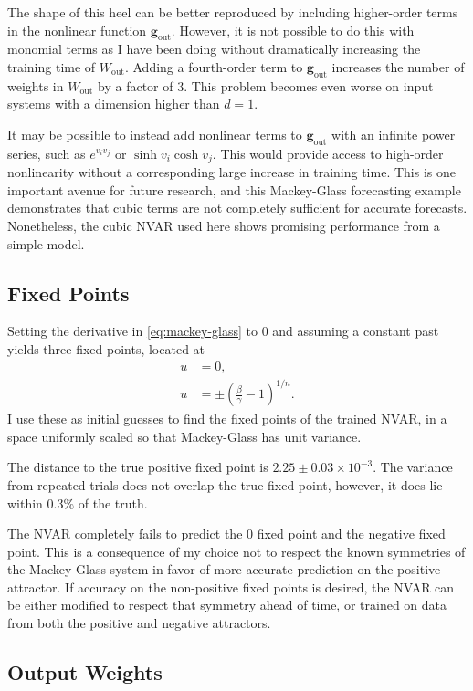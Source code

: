 The shape of this heel can be better reproduced by including
higher-order terms in the nonlinear function
$\bm{g}_\text{out}$. However, it is not possible to do this with
monomial terms as I have been doing without dramatically increasing
the training time of $W_\text{out}$. Adding a fourth-order term to $\bm{g}_\text{out}$ increases the number of weights in $W_\text{out}$ by a factor of $3$. This problem becomes even worse on input systems with a dimension higher than $d = 1$.

It may be possible to instead add
nonlinear terms to $\bm{g}_\text{out}$ with an infinite power series,
such as $e^{v_iv_j}$ or $\sinh{v_i}\cosh{v_j}$. This would provide
access to high-order nonlinearity without a corresponding large increase in training
time. This is one important avenue for future research, and this
Mackey-Glass forecasting example demonstrates that cubic terms are not
completely sufficient for accurate forecasts. Nonetheless, the cubic
NVAR used here shows promising performance from a simple model.

\subsection{Fixed Points}

Setting the derivative in \cref{eq:mackey-glass} to $0$ and assuming a
constant past yields three fixed points, located at
\begin{align}
  u &= 0, \\
  u &= \pm \left(\frac{\beta}{\gamma} - 1\right)^{1/n}.
\end{align}
I use these as initial guesses to find the fixed points of the trained NVAR, in a space uniformly scaled so that Mackey-Glass has unit variance.

The distance to the true positive fixed point is
$2.25\pm0.03\times10^{-3}$. The variance from repeated trials does not
overlap the true fixed point, however, it does lie within $0.3\%$ of
the truth.

The NVAR completely fails to predict the $0$ fixed point and the
negative fixed point. This is a consequence of my choice not to
respect the known symmetries of the Mackey-Glass system in favor of
more accurate prediction on the positive attractor. If accuracy on the
non-positive fixed points is desired, the NVAR can be either modified
to respect that symmetry ahead of time, or trained on data from both
the positive and negative attractors.

\subsection{Output Weights}\label{sec:nvar-mg-weights}

